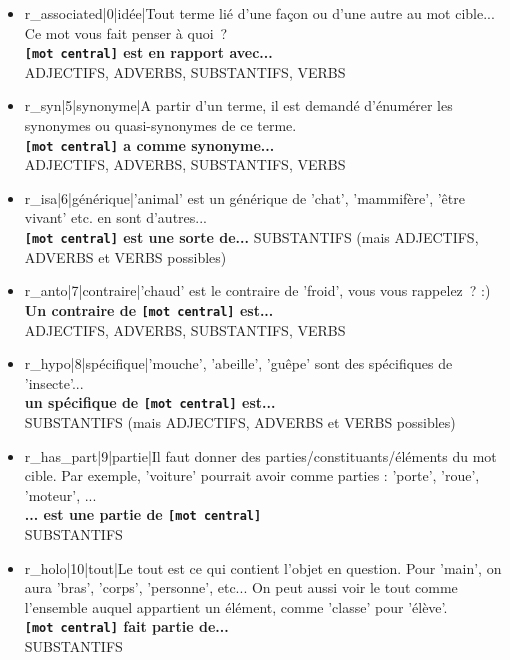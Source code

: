 \documentclass[a4paper,11pt,french]{article}
\begin{document}
\begin{itemize}

\item r\_associated|0|idée|Tout terme lié d'une façon ou d'une autre au mot cible... Ce mot vous fait penser à quoi~? \\
{\bf \verb![mot central]! est en rapport avec...} \\
ADJECTIFS, ADVERBS, SUBSTANTIFS, VERBS

\item r\_syn|5|synonyme|A partir d'un terme, il est demandé d'énumérer les synonymes ou quasi-synonymes de ce terme. \\
{\bf \verb![mot central]! a comme synonyme...} \\
ADJECTIFS, ADVERBS, SUBSTANTIFS, VERBS

\item r\_isa|6|générique|'animal' est un générique de 'chat', 'mammifère', 'être vivant' etc. en sont d'autres... \\
{\bf \verb![mot central]! est une sorte de...}
SUBSTANTIFS (mais ADJECTIFS, ADVERBS et VERBS possibles)

\item r\_anto|7|contraire|'chaud' est le contraire de 'froid', vous vous rappelez~? :) \\
{\bf Un contraire de \verb![mot central]! est...} \\
ADJECTIFS, ADVERBS, SUBSTANTIFS, VERBS

\item r\_hypo|8|spécifique|'mouche', 'abeille', 'guêpe' sont des spécifiques de 'insecte'... \\
{\bf un spécifique de \verb![mot central]! est...} \\
SUBSTANTIFS (mais ADJECTIFS, ADVERBS et VERBS possibles)

\item r\_has\_part|9|partie|Il faut donner des parties/constituants/éléments du mot cible. Par exemple, 'voiture' pourrait avoir comme parties : 'porte', 'roue', 'moteur', ... \\
{\bf ... est une partie de \verb![mot central]!} \\
SUBSTANTIFS

\item r\_holo|10|tout|Le tout est ce qui contient l'objet en question. Pour 'main', on aura 'bras', 'corps', 'personne', etc... On peut aussi voir le tout comme l'ensemble auquel appartient un élément, comme 'classe' pour 'élève'. \\
{\bf \verb![mot central]! fait partie de...} \\
SUBSTANTIFS


\end{itemize}
\end{document}
